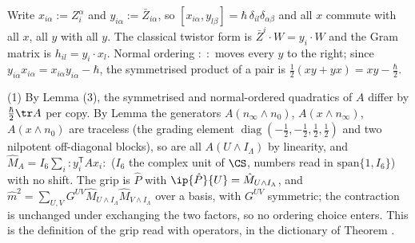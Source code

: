 Write $x_{i\alpha} := Z^{\alpha}_{i}$ and $y_{i\alpha} := \bar{Z}_{i\alpha}$, so $[x_{i\alpha}, y_{l\beta}] = \hbar\,\delta_{il}\delta_{\alpha\beta}$ and all $x$ commute with all $x$, all $y$ with all $y$. The classical twistor form is $\bar{Z}^{i}\cdot W = y_{i}\cdot W$ and the Gram matrix is $h_{il} = y_{i}\cdot x_{l}$. Normal ordering $:\;:$ moves every $y$ to the right; since $y_{i\alpha}x_{i\alpha} = x_{i\alpha}y_{i\alpha} - \hbar$, the symmetrised product of a pair is $\tfrac12(xy + yx) = xy - \tfrac{\hbar}{2}$.

(1) By Lemma (3), the symmetrised and normal-ordered quadratics of $A$ differ by $\tfrac{\hbar}{2}\tr A$ per copy. By Lemma  the generators $A(n_{\infty}\wedge n_{0})$, $A(x\wedge n_{\infty})$, $A(x\wedge n_{0})$ are traceless (the grading element $\operatorname{diag}(-\tfrac12,-\tfrac12,\tfrac12,\tfrac12)$ and two nilpotent off-diagonal blocks), so are all $A(U\wedge I_{\Lambda})$ by linearity, and $\hat{M}_{A} = I_{6}\sum_{i}:y_{i}^{\mathsf T}Ax_{i}:$ ($I_{6}$ the complex unit of $\CS$, numbers read in $\mathrm{span}\{1, I_{6}\}$) with no shift. The grip is $\hat{P}$ with $\ip{\hat{P}}{U} = \hat{M}_{U\wedge I_{\Lambda}}$, and $\hat{m}^{2} = \sum_{U,V}G^{UV}\hat{M}_{U\wedge I_{\Lambda}}\hat{M}_{V\wedge I_{\Lambda}}$ over a basis, with $G^{UV}$ symmetric; the contraction is unchanged under exchanging the two factors, so no ordering choice enters. This is the definition of the grip read with operators, in the dictionary of Theorem .

